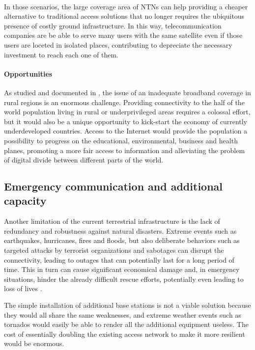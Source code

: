\paragraph{} 
In those scenarios, the large coverage area of \ac{NTN}s can help providing a cheaper alternative to traditional access solutions that no longer requires the ubiquitous presence of costly ground infrastructure. In this way, telecommunication companies are be able to serve many users with the same satellite even if those users are loceted in isolated places, contributing to depreciate the necessary investment to reach each one of them.

\paragraph{Opportunities}
As studied and documented in \cite{6g-challenge-opportunity-base-pyramid}, the issue of an inadequate broadband coverage in rural regions is an enormous challenge. Providing connectivity to the half of the world population living in rural or underprivileged areas requires a colossal effort, but it would also be a unique opportunity to kick-start the economy of currently underdeveloped countries. Access to the Internet would provide the population a possibility to progress on the educational, environmental, business and health planes, promoting a more fair access to information and alleviating the problem of digital divide between different parts of the world.

\subsection{Emergency communication and additional capacity}
Another limitation of the current terrestrial infrastructure is the lack of redundancy and robustness against natural disasters. Extreme events such as earthquakes, hurricanes, fires and floods, but also deliberate behaviors such as targeted attacks by terrorist organizations and sabotages can disrupt the connectivity, leading to outages that can potentially last for a long period of time. This in turn can cause significant economical damage and, in emergency situations, hinder the already difficult rescue efforts, potentially even leading to loss of lives \cite{ntn-6g-era-challenges-giordani}.

The simple installation of additional base stations is not a viable solution because they would all share the same weaknesses, and extreme weather events such as tornados would easily be able to render all the additional equipment useless. The cost of essentially doubling the existing access network to make it more resilient would be enormous.

